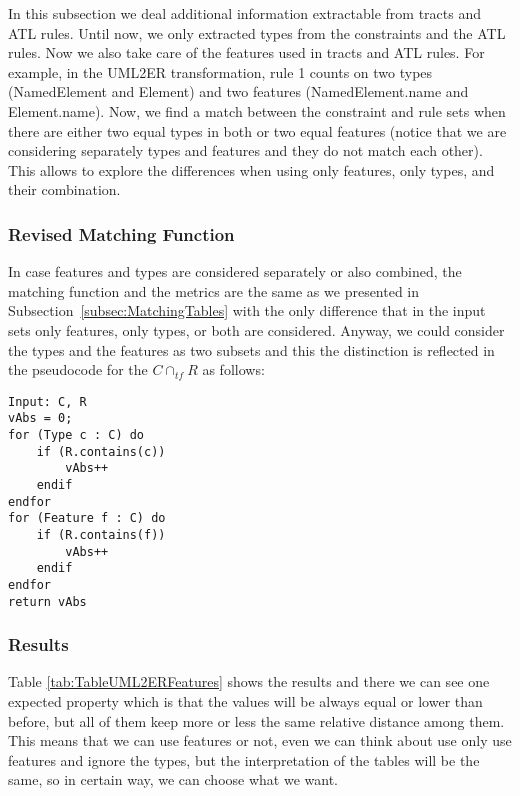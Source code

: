 In this subsection we deal additional information extractable from tracts and ATL rules. Until now, we only extracted types from the constraints and the ATL rules. Now we also take care of the features used in tracts and ATL rules. For example, in the UML2ER transformation, rule 1 counts on two types (NamedElement and Element) and two features (NamedElement.name and Element.name). Now, we find a match between the constraint and rule sets when there are either two equal types in both or two equal features (notice that we are considering separately types and features and they do not match each other). This allows to explore the differences when using only features, only types, and their combination.

\subsubsection{Revised Matching Function}

In case features and types are considered separately or also combined, the matching function and the metrics are the same as we presented in Subsection~\ref{subsec:MatchingTables} with the only difference that in the input sets only features, only types, or both are considered. Anyway, we could consider the types and the features as two subsets and this the distinction is reflected in the pseudocode for the $ C \cap_{tf} R $ as follows:


\begin{lstlisting}
Input: C, R
vAbs = 0;
for (Type c : C) do
    if (R.contains(c))
        vAbs++
    endif
endfor
for (Feature f : C) do
    if (R.contains(f))
        vAbs++
    endif
endfor
return vAbs
\end{lstlisting}

\subsubsection{Results}

Table \ref{tab:TableUML2ERFeatures} shows the results and there we can see one expected property which is that the values will be always equal or lower than before, but all of them keep more or less the same relative distance among them. This means that we can use features or not, even we can think about use only use features and ignore the types, but the interpretation of the tables will be the same, so in certain way, we can choose what we want.

